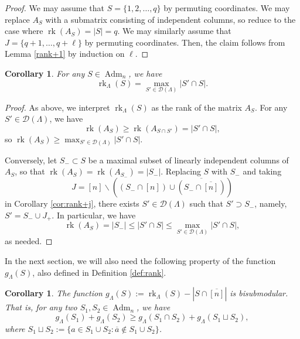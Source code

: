 \documentclass[12pt]{amsart}
\newtheorem{corollary}[definition]{Corollary}
\DeclareMathOperator{\Adm}{Adm}
\DeclareMathOperator{\rk}{rk}
\newcommand{\cD}{\mathcal{D}}
\begin{document}
\begin{proof}
We may assume that $S=\{1,2,\ldots,q\}$ by permuting coordinates. We may replace $A_S$ with a submatrix consisting of independent columns, so reduce to the case where $\rk(A_S)=|S|=q$. We may similarly assume that $J=\{q+1,\ldots,q+\ell\}$ by permuting coordinates. Then, the claim follows from Lemma \ref{rank+1} by induction on $\ell$.
\end{proof}

\begin{corollary}\label{cor:rank_in_terms_of_M}
    For any $S\in \Adm_n$, we have
    \begin{equation*}
        \rk_\Lambda(S)=\max_{S'\in\cD(\Lambda)}|S'\cap S|.
    \end{equation*}
\end{corollary}

\begin{proof}
As above, we interpret $\rk_\Lambda(S)$ as the rank of the matrix $A_S$. For any $S'\in \cD(\Lambda)$, we have
\begin{equation*}
    \rk(A_S)\ge \rk(A_{S\cap S'})=|S'\cap S|,
\end{equation*}
so $\rk(A_S)\ge \max_{S'\in\cD(\Lambda)}|S'\cap S|$. 

Conversely, let $S_{-}\subset S$ be a maximal subset of linearly independent columns of $A_S$, so that $\rk(A_S)=\rk(A_{S_{-}})=|S_{-}|$. Replacing $S$ with $S_{-}$ and taking
\begin{equation*}
    J=[n]\backslash \left((S_{-}\cap [n]) \cup \overline{(S_{-}\cap \overline{[n]})}\right)
\end{equation*}
in Corollary \ref{cor:rank+j}, there exists $S'\in\cD(\Lambda)$ such that $S'\supset S_{-}$, namely, $S'=S_{-}\cup J_{+}$. In particular, we have
\begin{equation*}
    \rk(A_S)=|S_{-}|\le |S'\cap S|\le \max_{S'\in\cD(\Lambda)}|S'\cap S|,
\end{equation*}
as needed.
\end{proof}

In the next section, we will also need the following property of the function $g_\Lambda(S)$, also defined in Definition \ref{def:rank}.

\begin{corollary}\label{cor:bisubmodular}
    The function $g_\Lambda(S):=\rk_\Lambda(S)-|S\cap \overline{[n]}|$ is \emph{bisubmodular}. That is, for any two $S_1,S_2\in\Adm_n$, we have
    \begin{equation*}
        g_\Lambda(S_1)+g_\Lambda(S_2)\ge g_\Lambda(S_1\cap S_2)+g_\Lambda(S_1 \sqcup S_2),
    \end{equation*}
    where $S_1\sqcup S_2:=\{a\in S_1\cup S_2:\overline{a}\notin S_1\cup S_2\}$.
\end{corollary}
\end{document}
